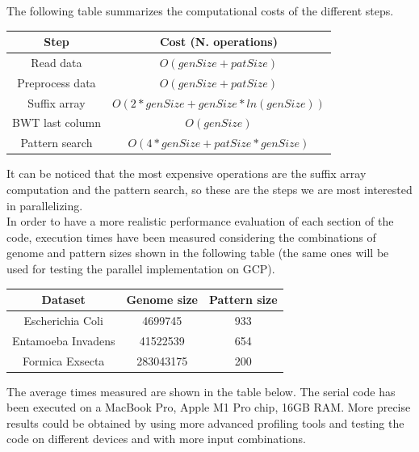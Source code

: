 \documentclass[final,5p,times,twocolumn,authoryear]{elsarticle}
\begin{document}
The following table summarizes the computational costs of the different steps.
\begin{center}
\begin{tabular}{|| c c ||}
\hline
Step & Cost (N. operations) \\
\hline
 Read data & $O(genSize + patSize)$ \\ 
 Preprocess data & $O(genSize + patSize)$ \\  
 Suffix array & $O(2*genSize + genSize*ln(genSize))$ \\
 BWT last column & $O(genSize)$ \\
 Pattern search & $O(4*genSize + patSize*genSize)$ \\
\hline
\end{tabular}
\end{center}
It can be noticed that the most expensive operations are the suffix array computation and the pattern search, so these are the steps we are most interested in parallelizing. \\
In order to have a more realistic performance evaluation of each section of the code, execution times have been measured considering the combinations of genome and pattern sizes shown in the following table (the same ones will be used for testing the parallel implementation on GCP).
\begin{center}
\begin{tabular}{|| c c c ||}
\hline
Dataset & Genome size & Pattern size \\
\hline
 Escherichia Coli & 4699745 & 933 \\
 Entamoeba Invadens & 41522539 & 654 \\
 Formica Exsecta & 283043175 & 200 \\
\hline
\end{tabular}
\end{center}
The average times measured are shown in the table below. The serial code has been executed on a MacBook Pro, Apple M1 Pro chip, 16GB RAM. More precise results could be obtained by using more advanced profiling tools and testing the code on different devices and with more input combinations.
\end{document}
